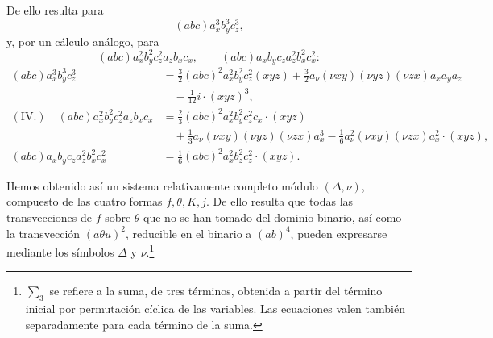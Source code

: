 \documentclass[11pt]{article}
\newcommand{\A}{\Delta}
\begin{document}
De ello resulta para
\[
(abc)a_x^3b_y^3c_z^3,
\]
y, por un cálculo análogo, para
\[
(abc)a_x^2b_y^2c_z^2a_zb_xc_x,\qquad
(abc)a_xb_yc_za_z^2b_x^2c_x^2:
\]
\[
\begin{aligned}
(abc)a_x^3b_y^3c_z^3
&=\frac32(abc)^2a_x^2b_y^2c_z^2(xyz)
+\frac32 a_\nu(\nu xy)(\nu yz)(\nu zx)a_xa_ya_z\\
&\quad-\frac1{12}i\cdot(xyz)^3,\\[0.4em]
(\text{IV.})\quad
(abc)a_x^2b_y^2c_z^2a_zb_xc_x
&=\frac23(abc)^2a_x^2b_y^2c_z^2c_x\cdot(xyz)\\
&\quad+\frac13a_\nu(\nu xy)(\nu yz)(\nu zx)a_x^3
-\frac16 a_\nu^2(\nu xy)(\nu zx)a_x^2\cdot(xyz),\\[0.4em]
(abc)a_xb_yc_za_z^2b_x^2c_x^2
&=\frac16(abc)^2a_x^2b_z^2c_z^2\cdot(xyz).
\end{aligned}
\]

Hemos obtenido así un sistema relativamente completo módulo $(\A,\nu)$, compuesto de las cuatro formas $f,\theta,K,j$. De ello resulta que todas las transvecciones de $f$ sobre $\theta$ que no se han tomado del dominio binario, así como la transvección $(a\theta u)^2$, reducible en el binario a $(ab)^4$, pueden expresarse mediante los símbolos $\A$ y $\nu$.\footnote{$\sum_3$ se refiere a la suma, de tres términos, obtenida a partir del término inicial por permutación cíclica de las variables. Las ecuaciones valen también separadamente para cada término de la suma.}
\end{document}
